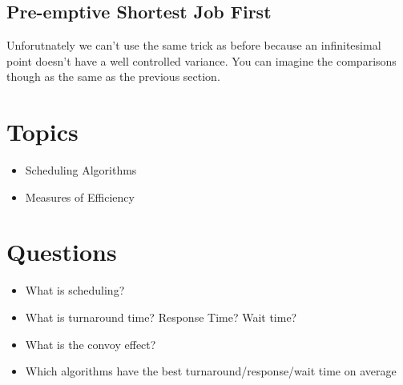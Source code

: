 \subsection{Pre-emptive Shortest Job First}

Unforutnately we can't use the same trick as before because an infinitesimal point doesn't have a well controlled variance.
You can imagine the comparisons though as the same as the previous section.

\section{Topics}

\begin{itemize}
\tightlist
\item
  Scheduling Algorithms
\item
  Measures of Efficiency
\end{itemize}

\section{Questions}

\begin{itemize}
\tightlist
\item
  What is scheduling?
\item
  What is turnaround time? Response Time? Wait time?
\item
  What is the convoy effect?
\item
  Which algorithms have the best turnaround/response/wait time on average
\end{itemize}



